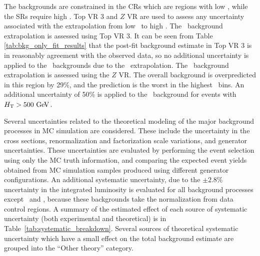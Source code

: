 The backgrounds are constrained in the CRs which are regions with low \HT,
while the SRs require high \HT.
Top VR 3 and $Z$ VR are used to assess any uncertainty associated with the
extrapolation from low \HT\ to high \HT.
The \TTBAR\ background extrapolation is assessed using Top VR 3. It can be seen
from Table \ref{tab:bkg_only_fit_results} that the post-fit background estimate
in Top VR 3 is in reasonably agreement with the observed data, so no additional
uncertainty is applied to the \TTBAR\ backgrounds due to the \HT\ extrapolation.
The \ZGAMMAJETS\ background extrapolation is assessed using the $Z$ VR.
The overall background is overpredicted in this region by 29\%, and the
prediction is the worst in the highest \HT\ bins.
An additional uncertainty of 50\% is applied to the \ZGAMMAJETS\ background
for events with $\HT > 500 \GeV$.

Several uncertainties related to the theoretical modeling of the major
background processes in MC simulation are considered.
These include the uncertainty in the cross sections, renormalization and
factorization scale variations, and generator uncertainties.
These uncertainties are evaluated by performing the event selection using only
the MC truth information, and comparing the expected event yields obtained
from MC simulation samples produced using different generator configurations.
An additional systematic uncertainty, due to the $\pm 2.8$\% uncertainty in the
integrated luminosity is evaluated for all background processes except
\TTBAR\ and \ZGAMMAJETS, because these backgrounds take the normalization from
data control regions.
A summary of the estimated effect of each source of systematic uncertainty
(both experimental and theoretical) is in Table~\ref{tab:systematic_breakdown}.
Several sources of theoretical systematic uncertainty which have a small effect
on the total background estimate are grouped into the ``Other theory'' category.

